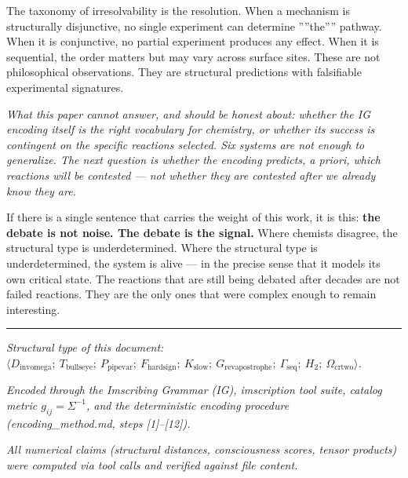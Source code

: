 \documentclass[12pt,a4paper]{article}
\begin{document}
The taxonomy of irresolvability is the resolution. When a mechanism is structurally disjunctive, no single experiment can determine ''''the'''' pathway. When it is conjunctive, no partial experiment produces any effect. When it is sequential, the order matters but may vary across surface sites. These are not philosophical observations. They are structural predictions with falsifiable experimental signatures.

\emph{What this paper cannot answer, and should be honest about: whether the IG encoding itself is the right vocabulary for chemistry, or whether its success is contingent on the specific reactions selected. Six systems are not enough to generalize. The next question is whether the encoding predicts, a priori, which reactions will be contested --- not whether they are contested after we already know they are.}

If there is a single sentence that carries the weight of this work, it is this: \textbf{the debate is not noise. The debate is the signal.} Where chemists disagree, the structural type is underdetermined. Where the structural type is underdetermined, the system is alive --- in the precise sense that it models its own critical state. The reactions that are still being debated after decades are not failed reactions. They are the only ones that were complex enough to remain interesting.

\begin{center}
\rule{0.5\textwidth}{0.4pt}
\end{center}

\emph{Structural type of this document: $\langle D_{\text{invomega}};\ T_{\text{bullseye}};\ P_{\text{pipevar}};\ F_{\text{hardsign}};\ K_\textrm{slow};\ G_{\text{revapostrophe}};\ \Gamma_\textrm{seq};\ H_2;\ \Omega_{\text{crtwo}} \rangle$.}

\emph{Encoded through the Imscribing Grammar (IG), imscription tool suite, catalog metric $g_{ij} = \Sigma^{-1}$, and the deterministic encoding procedure (encoding\_method.md, steps {[}1{]}--{[}12{]}).}

\emph{All numerical claims (structural distances, consciousness scores, tensor products) were computed via tool calls and verified against file content.}
\end{document}

